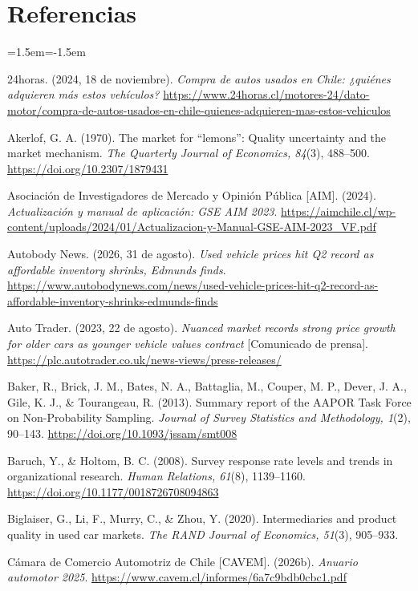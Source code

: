 \documentclass[11pt,a4paper]{article}
\begin{document}
\section*{Referencias}
\begin{list}{}{\leftmargin=1.5em\itemindent=-1.5em\itemsep=3pt}
\small
\item 24horas. (2024, 18 de noviembre). \emph{Compra de autos usados en Chile: ¿quiénes adquieren más estos vehículos?} \url{https://www.24horas.cl/motores-24/dato-motor/compra-de-autos-usados-en-chile-quienes-adquieren-mas-estos-vehiculos}
\item Akerlof, G. A. (1970). The market for \enquote{lemons}: Quality uncertainty and the market mechanism. \emph{The Quarterly Journal of Economics, 84}(3), 488–500. \url{https://doi.org/10.2307/1879431}
\item Asociación de Investigadores de Mercado y Opinión Pública [AIM]. (2024). \emph{Actualización y manual de aplicación: GSE AIM 2023}. \url{https://aimchile.cl/wp-content/uploads/2024/01/Actualizacion-y-Manual-GSE-AIM-2023_VF.pdf}
\item Autobody News. (2026, 31 de agosto). \emph{Used vehicle prices hit Q2 record as affordable inventory shrinks, Edmunds finds}. \url{https://www.autobodynews.com/news/used-vehicle-prices-hit-q2-record-as-affordable-inventory-shrinks-edmunds-finds}
\item Auto Trader. (2023, 22 de agosto). \emph{Nuanced market records strong price growth for older cars as younger vehicle values contract} [Comunicado de prensa]. \url{https://plc.autotrader.co.uk/news-views/press-releases/}
\item Baker, R., Brick, J. M., Bates, N. A., Battaglia, M., Couper, M. P., Dever, J. A., Gile, K. J., \& Tourangeau, R. (2013). Summary report of the AAPOR Task Force on Non-Probability Sampling. \emph{Journal of Survey Statistics and Methodology, 1}(2), 90–143. \url{https://doi.org/10.1093/jssam/smt008}
\item Baruch, Y., \& Holtom, B. C. (2008). Survey response rate levels and trends in organizational research. \emph{Human Relations, 61}(8), 1139–1160. \url{https://doi.org/10.1177/0018726708094863}
\item Biglaiser, G., Li, F., Murry, C., \& Zhou, Y. (2020). Intermediaries and product quality in used car markets. \emph{The RAND Journal of Economics, 51}(3), 905–933.
\item Cámara de Comercio Automotriz de Chile [CAVEM]. (2026b). \emph{Anuario automotor 2025}. \url{https://www.cavem.cl/informes/6a7c9bdb0cbc1.pdf}

\end{list}
\end{document}
